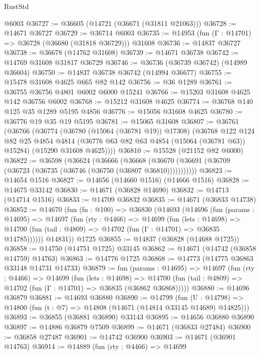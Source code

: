 \begin{lexlean}{RustStd}
\begin{coremodule}
    @6003
@36727 := @36605 (@14721 (@36671 (@31811 @21063)))
@36728 := @14671 @36727
@36729 := @36714 @6003
@36735 := @14953 (fun (Γ : @14701) => @36728 (@36680 (@31818 @36729))) @31608
@36736 := @14837 @36727
@36738 := @36678 (@14762 @31608)
@36739 := @14671 @36738
@36742 := @14769 @31608 @31817 @36729
@36746 := @36736 (@36739 @36742) (@14989 @36604)
@36750 := @14837 @36738 @36742 (@14994 @36677)
@36755 := @15478 @31608 @4625 @665 @82 @142
@36756 := @36 @1289
@36761 := @36755 @36756 @4801 @6002 @6000 @15241
@36766 := @15203 @31608 @4625 @142 @36756 @6002
@36768 := @15212 @31608 @4625
@36774 := @36768 @140 @125 @35 @1289 @5195 @4856
@36776 := @15056 @31608 @4625
@36780 := @36776 @19 @35 @19 @5195
@36781 := @15065 @31608
@36807 := @36761
    (@36766
      (@36774
        (@36780 (@15064 (@36781 @19)) @17308)
        (@36768
          @122
          @124
          @82
          @25
          @4854
          @4814
          (@36776 @63 @82 @63 @4854 (@15064 (@36781 @63)) @15284)
          (@15290 @31608 @4625))))
@36810 := @15528 (@21152 @82 @6000)
@36822 := @36598
    (@36624
      (@36666
        (@36668 (@36670 (@36691 (@36709 (@36723 (@36735 (@36746 (@36750 (@36807 @36810)))))))))))
@36823 := @14654 @1516
@36827 := @14656 (@14660 @1516) (@14666 @1516)
@36828 := @14675 @33142
@36830 := @14671 (@36828 @14690)
@36832 := @14713 (@14714 @1516)
@36833 := @14709 @36832
@36835 := @14671 (@36833 @14738)
@36852 := @14670
    (fun (fn : @100) =>
    @36830
      (@14693
        (@14696
          (fun (params : @14695) =>
          @14697
            (fun (rty : @4466) =>
            @14699
              (fun (lets : @14698) =>
              @14700 (fun (tail : @4809) => @14702 (fun (Γ : @14701) => @36835 @14785))))))
        @14831))
    @1725
@36855 := @14837 (@36828 (@14688 @1725))
@36858 := @14750 (@14751 @1725) @33145
@36862 := @14671 (@14742 (@36858 @14759) @14763)
@36863 := @14776 @1725
@36868 := @14773 (@14775 @36863 @33148 @14731 @14733)
@36879 := fun (params : @14695) =>
  @14697
    (fun (rty : @4466) =>
    @14699
      (fun (lets : @14698) =>
      @14700 (fun (tail : @4809) => @14702 (fun (Γ : @14701) => @36835 (@36862 @36868)))))
@36880 := @14696 @36879
@36881 := @14693 @36880
@36890 := @14799
    (fun (U : @14798) => @14800 (fun (t : @7) => @14808 (@14671 (@14814 @33145 @14689) @14825)))
@36893 := @36855 (@36881 @36890) @33143
@36895 := @14656 @36880 @36890
@36897 := @14886 @36879 @7509
@36899 := @14671 (@36833 @27484)
@36900 := @36858 @27487
@36901 := @14742 @36900
@36903 := @14671 (@36901 @14763)
@36914 := @14889
    (fun (rty : @4466) =>
    @14699

\end{coremodule}
\end{lexlean}

